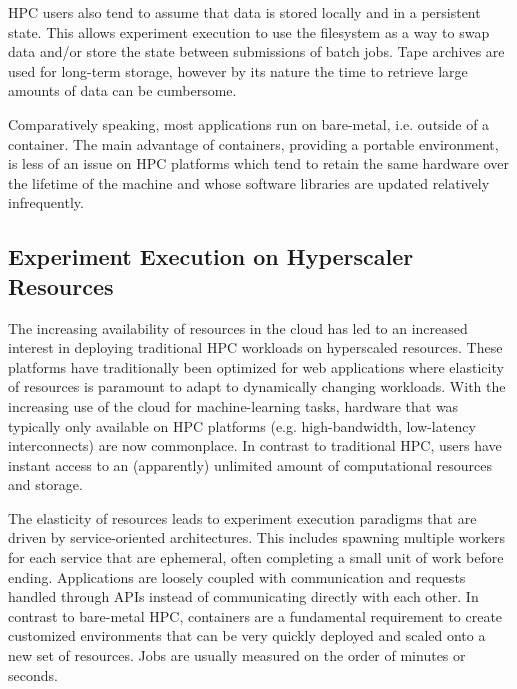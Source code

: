 \documentclass[utf8]{FrontiersinVancouver} %
\begin{document}
HPC users also tend to assume that data is stored locally and in a persistent state. This allows experiment execution to use the filesystem as a way to swap data and/or store the state between submissions of batch jobs. Tape archives are used for long-term storage, however by its nature the time to retrieve large amounts of data can be cumbersome.

Comparatively speaking, most applications run on bare-metal, i.e. outside of a container. The main advantage of containers, providing a portable environment, is less of an issue on HPC platforms which tend to retain the same hardware over the lifetime of the machine and whose software libraries are updated relatively infrequently.

\subsection{Experiment Execution on Hyperscaler Resources}

The increasing availability of resources in the cloud has led to an increased interest in deploying traditional HPC workloads on hyperscaled resources. These platforms have traditionally been optimized for web applications where elasticity of resources is paramount to adapt to dynamically changing workloads.  With the increasing use of the cloud for machine-learning tasks, hardware that was typically only available on HPC platforms (e.g. high-bandwidth, low-latency interconnects) are now commonplace. In contrast to traditional HPC, users have instant access to an (apparently) unlimited amount of computational resources and storage.

The elasticity of resources leads to experiment execution paradigms that are driven by service-oriented architectures. This includes spawning multiple workers for each service that are ephemeral, often completing a small unit of work before ending. Applications are loosely coupled with communication and requests handled through APIs instead of communicating directly with each other.  In contrast to bare-metal HPC, containers are a fundamental requirement to create customized environments that can be very quickly deployed and scaled onto a new set of resources. Jobs are usually measured on the order of minutes or seconds.

\end{document}
